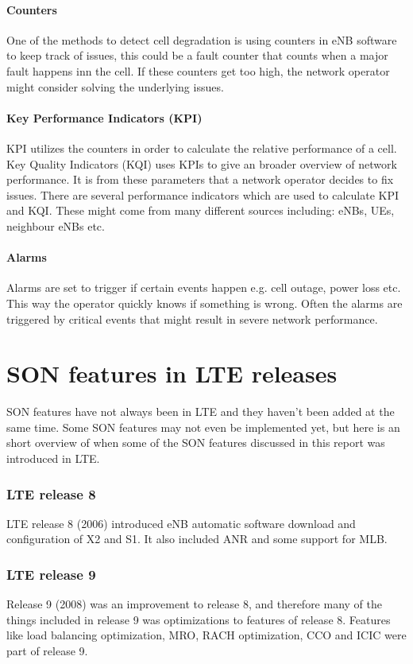 \documentclass{report}
\begin{document}
\subsubsection{Counters}
One of the methods to detect cell degradation is using counters in eNB software to keep track of issues, this could be a fault counter that counts when a major fault happens inn the cell. If these counters get too high, the network operator might consider solving the underlying issues.
\subsubsection{Key Performance Indicators (KPI)}
KPI utilizes the counters in order to calculate the relative performance of a cell. Key Quality Indicators (KQI) uses KPIs to give an broader overview of network performance. It is from these parameters that a network operator decides to fix issues. 
There are several performance indicators which are used to calculate KPI and KQI. These might come from many different sources including: eNBs, UEs, neighbour eNBs etc. 
\subsubsection{Alarms}
Alarms are set to trigger if certain events happen e.g. cell outage, power loss etc. This way the operator quickly knows if something is wrong. Often the alarms are triggered by critical events that might result in severe network performance.  \cite{snov}

\chapter{SON features in LTE releases}
SON features have not always been in LTE and they haven't been added at the same time. Some SON features may not even be implemented yet, but here is an short overview of when some of the SON features discussed in this report was introduced in LTE. 
\subsection{LTE release 8}
LTE release 8 (2006) introduced eNB automatic software download and configuration of X2 and S1. It also included ANR and some support for MLB.
\subsection{LTE release 9}
Release 9 (2008) was an improvement to release 8, and therefore many of the things included in release 9 was optimizations to features of release 8. Features like load balancing optimization, MRO, RACH optimization, CCO and ICIC were part of release 9. 
\end{document}
